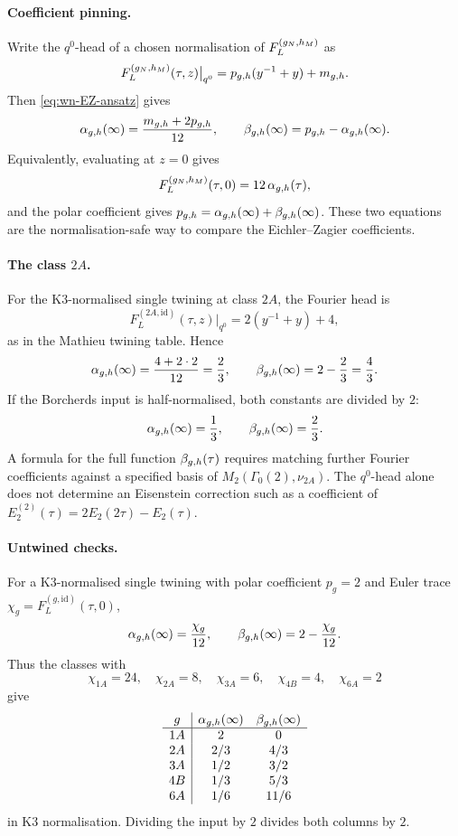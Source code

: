 \paragraph{Coefficient pinning.}
Write the $q^0$-head of a chosen normalisation of $F_L^{(g_N,h_M)}$ as
\[
  F_L^{(g_N,h_M)}(\tau,z)\big|_{q^0}
  =
  p_{g,h}(y^{-1}+y)+m_{g,h}.
\]
Then \eqref{eq:wn-EZ-ansatz} gives
\begin{equation}
\label{eq:wn-EZ-pinning-equations}
  \alpha_{g,h}(\infty)=\frac{m_{g,h}+2p_{g,h}}{12},
  \qquad
  \beta_{g,h}(\infty)=p_{g,h}-\alpha_{g,h}(\infty).
\end{equation}
Equivalently, evaluating at $z=0$ gives
\[
  F_L^{(g_N,h_M)}(\tau,0)=12\,\alpha_{g,h}(\tau),
\]
and the polar coefficient gives
$p_{g,h}=\alpha_{g,h}(\infty)+\beta_{g,h}(\infty)$.  These two equations are the
normalisation-safe way to compare the Eichler--Zagier coefficients.

\paragraph{The class \(2A\).}
For the K3-normalised single twining at class $2A$, the Fourier head is
\[
  F_L^{(2A,\mathrm{id})}(\tau,z)\big|_{q^0}
  =
  2(y^{-1}+y)+4,
\]
as in the Mathieu twining table.  Hence
\[
  \alpha_{g,h}(\infty)=\frac{4+2\cdot2}{12}=\frac23,\qquad
  \beta_{g,h}(\infty)=2-\frac23=\frac43.
\]
If the Borcherds input is half-normalised, both constants are divided by
$2$:
\[
  \alpha_{g,h}(\infty)=\frac13,\qquad
  \beta_{g,h}(\infty)=\frac23.
\]
A formula for the full function $\beta_{g,h}(\tau)$ requires matching further
Fourier coefficients against a specified basis of
$M_2(\Gamma_0(2),\nu_{2A})$.  The $q^0$-head alone does not determine an
Eisenstein correction such as a coefficient of
$E_2^{(2)}(\tau)=2E_2(2\tau)-E_2(\tau)$.

\paragraph{Untwined checks.}
For a K3-normalised single twining with polar coefficient
$p_g=2$ and Euler trace $\chi_g=F_L^{(g,\mathrm{id})}(\tau,0)$,
\[
  \alpha_{g,h}(\infty)=\frac{\chi_g}{12},
  \qquad
  \beta_{g,h}(\infty)=2-\frac{\chi_g}{12}.
\]
Thus the classes with
\[
  \chi_{1A}=24,\quad \chi_{2A}=8,\quad \chi_{3A}=6,\quad
  \chi_{4B}=4,\quad \chi_{6A}=2
\]
give
\[
\begin{array}{c|cc}
g & \alpha_{g,h}(\infty) & \beta_{g,h}(\infty)\\\hline
1A & 2 & 0\\
2A & 2/3 & 4/3\\
3A & 1/2 & 3/2\\
4B & 1/3 & 5/3\\
6A & 1/6 & 11/6
\end{array}
\]
in K3 normalisation.  Dividing the input by $2$ divides both columns by
$2$.

